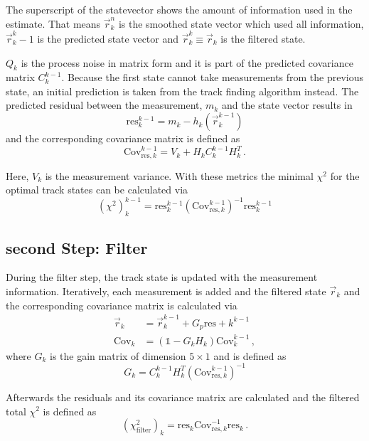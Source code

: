 The superscript of the statevector shows the amount of information used in the estimate.
That means $\vec{r}_k^n$ is the smoothed state vector which used all information,
$\vec{r}_k^k-1$ is the predicted state vector and $\vec{r}_k^k \equiv \vec{r}_k$ is the filtered state.

$Q_k$ is the process noise in matrix form and it is part of the predicted
covariance matrix $C_k^{k-1}$.
Because the first state cannot take measurements from the previous state, an initial prediction is taken from the track finding algorithm instead.
The predicted residual between the measurement, $m_k$ and the state vector results in
\begin{equation*}
  \text{res}_k^{k-1} = m_k - h_k\left( \vec{r}_k^{k-1} \right)
\end{equation*}
and the corresponding covariance matrix is defined as
\begin{equation*}
  \text{Cov}_{\text{res},k}^{k-1} = V_k + H_k C_k^{k-1} H_k^T\,.
\end{equation*}

Here, $V_k$ is the measurement variance. With these metrics the minimal $\chi^2$ for the optimal track states can be calculated via
\begin{equation*}
  \left( \chi^2 \right)_k^{k-1} =
  \text{res}_k^{k-1} \left(\text{Cov}_{\text{res},k}^{k-1}\right)^{-1} \text{res}_k^{k-1}
\end{equation*}

\subsection{second Step: Filter}
During the filter step, the track state is updated with the measurement information.
Iteratively, each measurement is added and the filtered state $\vec{r}_k$ and the corresponding covariance matrix is calculated via
\begin{align*}
  \vec{r}_k &= \vec{r}_k^{k-1} + G_p \text{res}+k^{k-1} \\
  \text{Cov}_k &= \left(\mathbb{1} - G_k H_k\right) \text{Cov}_k^{k-1}\,,
\end{align*}
where $G_k$ is the gain matrix of dimension $5\times1$ and is defined as
\begin{equation*}
  G_k = C_k^{k-1} H_k^T \left( \text{Cov}_{\text{res},k}^{k-1} \right)^{-1}
\end{equation*}

Afterwards the residuals and its covariance matrix are calculated and the filtered total $\chi^2$ is defined as
\begin{equation*}
  \left( \chi^2_{\text{filter}} \right)_k = \text{res}_k \text{Cov}_{\text{res},k}^{-1} \text{res}_k\,.
\end{equation*}

